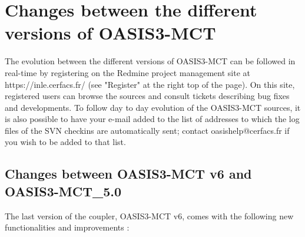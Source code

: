 \newpage

\chapter{Changes between the different versions of OASIS3-MCT}
\label{sec_changes}

The evolution between the different versions of OASIS3-MCT can be
followed in real-time by registering on the Redmine project management
site at https://inle.cerfacs.fr/ (see "Register" at the right top of
the page). On this site, registered users can browse the sources and
consult tickets describing bug fixes and developments. To follow day
to day evolution of the OASIS3-MCT sources, it is also possible to
have your e-mail added to the list of addresses to which the log files
of the SVN checkins are automatically sent; contact
oasishelp@cerfacs.fr if you wish to be added to that list.

\section{Changes between OASIS3-MCT v6 and OASIS3-MCT\_5.0}

The last version of the coupler, OASIS3-MCT v6, comes with the
following new functionalities and improvements :

